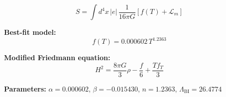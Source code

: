 
\begin{equation}
  S = \int d^4x \, |e| \, \frac{1}{16\pi G} \left[ f(T) + \mathcal{L}_m \right]
\end{equation}

\textbf{Best-fit model:}
\begin{equation}
  f(T) = 0.000602 \, T^{1.2363}
\end{equation}

\textbf{Modified Friedmann equation:}
\begin{equation}
  H^2 = \frac{8\pi G}{3} \rho - \frac{f}{6} + \frac{T f_T}{3}
\end{equation}

\textbf{Parameters:}
$\alpha = 0.000602$, \quad
$\beta = -0.015430$, \quad
$n = 1.2363$, \quad
$\Lambda_{\text{BI}} = 26.4774$